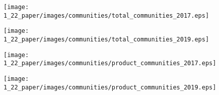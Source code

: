 \documentclass[a4paper, 12pt]{article}
\begin{document}
\begin{figure}[H]
    \centering
    \texttt{[image: 1\_22\_paper/images/communities/total\_communities\_2017.eps]}
    \caption{}
    \label{fig:total_comm_2017}
\end{figure}
\begin{figure}[H]
    \centering
    \texttt{[image: 1\_22\_paper/images/communities/total\_communities\_2019.eps]}
    \caption{}
    \label{fig:total_comm_2019}
\end{figure}
\begin{figure}[H]
    \centering
    \texttt{[image: 1\_22\_paper/images/communities/product\_communities\_2017.eps]}
    \caption{}
    \label{fig:764_comm_2017}
\end{figure}
\begin{figure}[H]
    \centering
    \texttt{[image: 1\_22\_paper/images/communities/product\_communities\_2019.eps]}
    \caption{}
    \label{fig:764_comm_2019}
\end{figure}
%
\newpage
\end{document}
